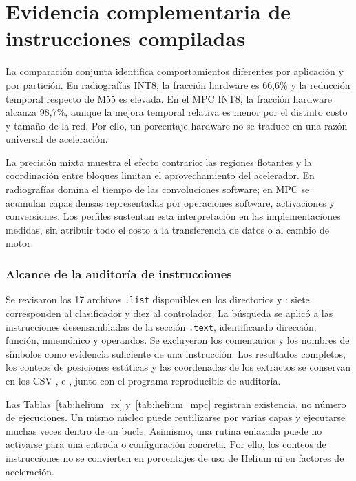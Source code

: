 \chapter{Evidencia complementaria de instrucciones compiladas}\label{anexo:instrucciones}


La comparación conjunta identifica comportamientos diferentes por aplicación y por partición. En radiografías INT8, la fracción hardware es 66,6\% y la reducción temporal respecto de M55 es elevada. En el MPC INT8, la fracción hardware alcanza 98,7\%, aunque la mejora temporal relativa es menor por el distinto costo y tamaño de la red. Por ello, un porcentaje hardware no se traduce en una razón universal de aceleración.

La precisión mixta muestra el efecto contrario: las regiones flotantes y la coordinación entre bloques limitan el aprovechamiento del acelerador. En radiografías domina el tiempo de las convoluciones software; en MPC se acumulan capas densas representadas por operaciones software, activaciones y conversiones. Los perfiles sustentan esta interpretación en las implementaciones medidas, sin atribuir todo el costo a la transferencia de datos o al cambio de motor.
\FloatBarrier
\subsection{Alcance de la auditoría de instrucciones}\label{sec:auditoria_helium}
Se revisaron los 17 archivos \texttt{.list} disponibles en los directorios  y : siete corresponden al clasificador y diez al controlador. La búsqueda se aplicó a las instrucciones desensambladas de la sección \texttt{.text}, identificando dirección, función, mnemónico y operandos. Se excluyeron los comentarios y los nombres de símbolos como evidencia suficiente de una instrucción. Los resultados completos, los conteos de posiciones estáticas y las coordenadas de los extractos se conservan en los CSV ,  e , junto con el programa reproducible de auditoría.

Las Tablas~\ref{tab:helium_rx} y~\ref{tab:helium_mpc} registran existencia, no número de ejecuciones. Un mismo núcleo puede reutilizarse por varias capas y ejecutarse muchas veces dentro de un bucle. Asimismo, una rutina enlazada puede no activarse para una entrada o configuración concreta. Por ello, los conteos de instrucciones no se convierten en porcentajes de uso de Helium ni en factores de aceleración.

